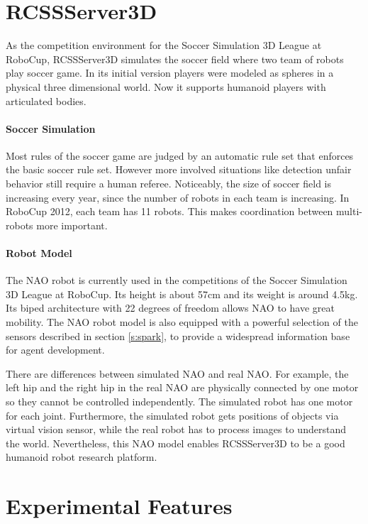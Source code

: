 \documentclass{llncs}
\begin{document}
\section{RCSSServer3D}
\label{s:rcssserver3d}

As the competition environment for the Soccer Simulation 3D League at RoboCup, 
RCSSServer3D simulates the soccer field where two team of robots play soccer game.
In its initial version players were modeled as spheres in a physical three dimensional world. Now it supports humanoid players with articulated bodies.

\paragraph{Soccer Simulation}
Most rules of the soccer game are judged by an automatic rule set that enforces the basic soccer rule set.
However more involved situations like detection unfair behavior still require a human referee.
Noticeably, the size of soccer field is increasing every year, since the number of robots in each team is increasing. In RoboCup 2012, each team has 11 robots.
This makes coordination between multi-robots more important.

\paragraph{Robot Model}
The NAO robot is currently used in the competitions of the Soccer Simulation 3D League at RoboCup. Its height is about 57cm and its weight is around 4.5kg.
Its biped architecture with 22 degrees of freedom allows NAO to have great mobility.
The NAO robot model is also equipped with a powerful selection of the
sensors described in section \ref{s:spark}, to provide a widespread information base for
agent development.

There are differences between simulated NAO and real NAO. For example, the left hip and the right hip in the real NAO are physically connected by one motor so they cannot be controlled independently. The simulated robot has one motor for each joint. Furthermore, the simulated robot gets positions of objects via virtual vision sensor, while the real robot has to process images to understand the world. Nevertheless, this NAO model enables RCSSServer3D to be a good humanoid robot research platform.


\section{Experimental Features}
\label{s:ongoing}
\end{document}
